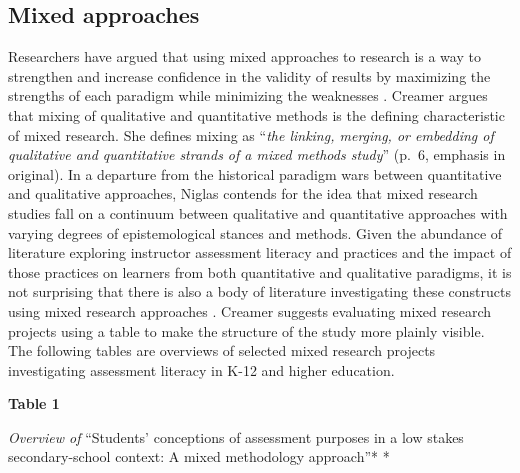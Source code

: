 \documentclass[
]{book}
\begin{document}
\hypertarget{mixed-approaches}{%
\subsection{Mixed approaches}\label{mixed-approaches}}

Researchers have argued that using mixed approaches to research is a way to strengthen and increase confidence in the validity of results by maximizing the strengths of each paradigm while minimizing the weaknesses \citep{creswellResearchDesignQualitative2009, mckimValueMixedMethods2017}. Creamer \citeyearpar{creamerIntroductionFullyIntegrated2018} argues that mixing of qualitative and quantitative methods is the defining characteristic of mixed research. She defines mixing as ``\emph{the linking, merging, or embedding of qualitative and quantitative strands of a mixed methods study}'' (p.~6, emphasis in original). In a departure from the historical paradigm wars between quantitative and qualitative approaches, Niglas \citeyearpar{niglasMultidimensionalModelResearch2010} contends for the idea that mixed research studies fall on a continuum between qualitative and quantitative approaches with varying degrees of epistemological stances and methods. Given the abundance of literature exploring instructor assessment literacy and practices and the impact of those practices on learners from both quantitative and qualitative paradigms, it is not surprising that there is also a body of literature investigating these constructs using mixed research approaches \citep{esfandiariMixedmethodsCrosssectionalStudy2016, ogan-bekirogluPreServiceTeachers2014, solomonidouStudentsConceptionsAssessment2017}. Creamer \citeyearpar{creamerIntroductionFullyIntegrated2018} suggests evaluating mixed research projects using a table to make the structure of the study more plainly visible. The following tables are overviews of selected mixed research projects investigating assessment literacy in K-12 and higher education.

\textbf{Table 1}

\emph{Overview of }``Students' conceptions of assessment purposes in a low stakes secondary-school context: A mixed methodology approach''* \citep{solomonidouStudentsConceptionsAssessment2017}*
\end{document}
